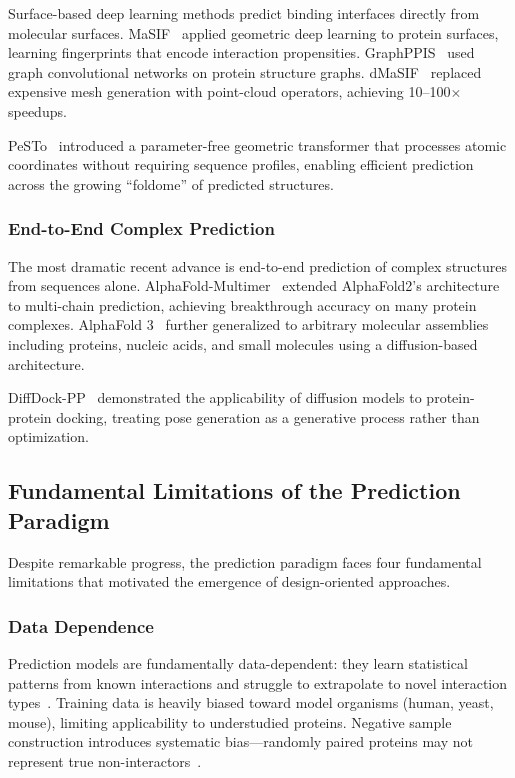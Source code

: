 Surface-based deep learning methods predict binding interfaces directly from molecular surfaces. MaSIF~\cite{gainza2020masif} applied geometric deep learning to protein surfaces, learning fingerprints that encode interaction propensities. GraphPPIS~\cite{cao2022graphppis} used graph convolutional networks on protein structure graphs. dMaSIF~\cite{sverrisson2021dmasif} replaced expensive mesh generation with point-cloud operators, achieving 10--100$\times$ speedups.

PeSTo~\cite{gao2023pestoppi} introduced a parameter-free geometric transformer that processes atomic coordinates without requiring sequence profiles, enabling efficient prediction across the growing ``foldome'' of predicted structures.

\subsubsection{End-to-End Complex Prediction}

The most dramatic recent advance is end-to-end prediction of complex structures from sequences alone. AlphaFold-Multimer~\cite{evans2022alphafoldmultimer} extended AlphaFold2's architecture~\cite{jumper2021alphafold} to multi-chain prediction, achieving breakthrough accuracy on many protein complexes. AlphaFold 3~\cite{abramson2024alphafold3} further generalized to arbitrary molecular assemblies including proteins, nucleic acids, and small molecules using a diffusion-based architecture.

DiffDock-PP~\cite{ketata2023diffdockpp} demonstrated the applicability of diffusion models to protein-protein docking, treating pose generation as a generative process rather than optimization.

\subsection{Fundamental Limitations of the Prediction Paradigm}
\label{subsec:limitations}

Despite remarkable progress, the prediction paradigm faces four fundamental limitations that motivated the emergence of design-oriented approaches.

\subsubsection{Data Dependence}

Prediction models are fundamentally data-dependent: they learn statistical patterns from known interactions and struggle to extrapolate to novel interaction types~\cite{kewalramani2023state}. Training data is heavily biased toward model organisms (human, yeast, mouse), limiting applicability to understudied proteins. Negative sample construction introduces systematic bias---randomly paired proteins may not represent true non-interactors~\cite{smialowski2010negatome}.

